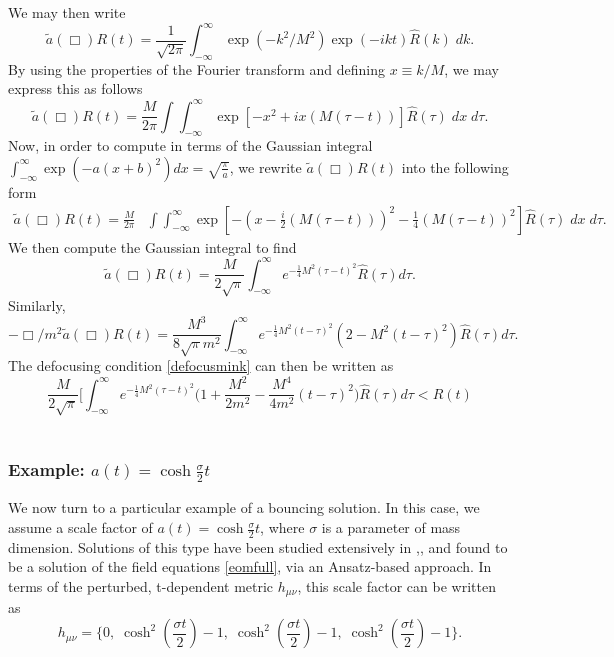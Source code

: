 We may then write
\[
{\tilde a}(\Box)R(t)	=	\frac{1}{\sqrt{2\pi}}\int_{-\infty}^{\infty}\exp(-k^{2}/M^{2})\exp(-ikt)\hat{R}(k)\;dk
.\]
By using the properties of the Fourier transform and defining $x\equiv k/M$, we may express this as follows
\[
{\tilde{a}}(\Box)R(t)=\frac{M}{2\pi}\int\int_{-\infty}^{\infty}\exp\left[-x^{2}+ix\left(M(\tau-t)\right)\right]\hat{R}(\tau)\;dx\;d\tau
.\]
Now, in order to compute in terms of the Gaussian integral
$
\int_{-\infty}^{\infty}\exp\left(-a(x+b)^{2}\right)dx=\sqrt{\frac{\pi}{a}}
$,
we rewrite ${\tilde a}(\Box)R(t)$ into the following form
\begin{align}{\tilde{a}}(\Box)R(t)=\frac{M}{2\pi} & \int\int_{-\infty}^{\infty}\exp\left[-\left(x-\frac{i}{2}\left(M(\tau-t)\right)\right)^{2}-\frac{1}{4}\left(M(\tau-t)\right)^{2}\right]\hat{R}(\tau)\;dx\;d\tau.\end{align}
We then compute the Gaussian integral to find
\[
{\tilde a}(\Box)R(t)=\frac{M}{2\sqrt{\pi}}\int_{-\infty}^{\infty}e^{-\frac{1}{4}M^2(\tau-t)^{2}}\hat{R}(\tau)d\tau
.\]
Similarly,
\[
-\Box/m^{2}\tilde{a}(\Box)R(t)=\frac{M^{3}}{8\sqrt{\pi}m^{2}}\int_{-\infty}^{\infty}e^{-\frac{1}{4}M^{2}(t-\tau)^{2}}\left(2-M^{2}(t-\tau)^{2}\right)\hat{R}(\tau)d\tau
.\]
The defocusing condition \eqref{defocusmink} can then be written as
\[
\label{defocusint}
\frac{M}{2\sqrt{\pi}}\biggl[\int_{-\infty}^{\infty} e^{-\frac{1}{4}M^2(\tau-t)^{2}}\biggl(1+\frac{M^{2}}{2m^{2}}-\frac{M^{4}}{4m^{2}}(t-\tau)^{2}\biggr)\hat{R}(\tau)d\tau<R(t)
\]
\\\subsubsection*{Example: $a(t)=\cosh\frac{\sigma}{2} t$}
We now turn to a particular example of a bouncing solution. In this case, we assume a scale factor of $a(t)=\cosh\frac{\sigma}{2} t$, where $\sigma$ is a  parameter of mass dimension. Solutions of this type have been studied extensively in \cite{Koshelev:2012qn},\cite{Koshelev:2013lfm},\cite{Biswas:2005qr} and found to be a solution of the field equations \eqref{eomfull}, via an Ansatz-based approach. In terms of the perturbed, t-dependent metric $h_{\mu\nu}$, this scale factor can be written as
\[
h_{\mu\nu}=\biggl\{0,\;\cosh^2(\frac{\sigma t}{2})-1,\;\cosh^2(\frac{\sigma t}{2})-1,\;\cosh^2(\frac{\sigma t}{2})-1\biggr\}.
\]
